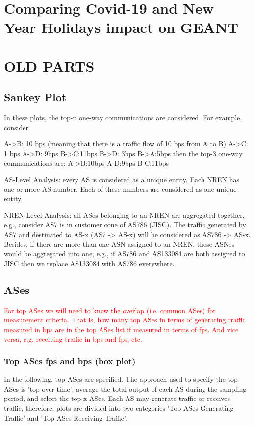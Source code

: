 \documentclass[10pt, journal, letterpaper]{IEEEtran}
\newcommand{\red}[1]{\textcolor{red}{#1}}
\begin{document}
\section{Comparing Covid-19 and New Year Holidays impact on GEANT}




\section{OLD PARTS}
\subsection{Sankey Plot}
In these plots, the top-n one-way communications are considered. For example, consider

A->B: 10 bps (meaning that there is a traffic flow of 10 bps from A to B)
A->C: 1 bps
A->D: 9bps
B->C:11bps
B->D: 3bps
B->A:5bps
then the top-3 one-way communications are:
A->B:10bps
A-D:9bps
B-C:11bps

AS-Level Analysis: every AS is considered as a unique entity. Each NREN has one or more AS-number. Each of these numbers are considered as one unique entity.

NREN-Level Analysis: all ASes belonging to an NREN are aggregated together, e.g., consider AS7 is in customer cone of AS786 (JISC). The traffic generated by AS7 and destinated to AS-x (AS7 -> AS-x) will be considered as AS786 -> AS-x. Besides, if there are more than one ASN assigned to an NREN, these ASNes would be aggregated into one, e.g., if AS786 and AS133084 are both assigned to JISC then we replace AS133084 with AS786 everywhere.



\subsection{ASes}

\red{For top ASes we will need to know the overlap (i.e. common ASes) for measurement criteria. That is, how many top ASes in terms of generating traffic measured in bps are in the top ASes list if measured in terms of fps. And vice versa, e.g. receiving traffic in bps and fps, etc.}

\subsubsection{Top ASes fps and bps (box plot)}
In the following, top ASes are specified. The approach used to specify the top ASes is 'top over time': average the total output of each AS during the sampling period, and select the top x ASes.
Each AS may generate traffic or receives traffic, therefore, plots are divided into two categories 'Top ASes Generating Traffic' and 'Top ASes Receiving Traffic'.
\end{document}
